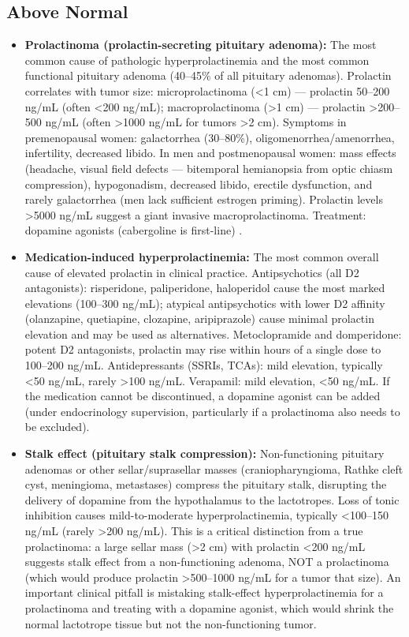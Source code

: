 \subsection*{Above Normal}
\begin{itemize}
  \item \textbf{Prolactinoma (prolactin-secreting pituitary adenoma):} The most common cause of pathologic hyperprolactinemia and the most common functional pituitary adenoma (40--45\% of all pituitary adenomas). Prolactin correlates with tumor size: microprolactinoma (<1 cm) --- prolactin 50--200 ng/mL (often <200 ng/mL); macroprolactinoma (>1 cm) --- prolactin >200--500 ng/mL (often >1000 ng/mL for tumors >2 cm). Symptoms in premenopausal women: galactorrhea (30--80\%), oligomenorrhea/amenorrhea, infertility, decreased libido. In men and postmenopausal women: mass effects (headache, visual field defects --- bitemporal hemianopsia from optic chiasm compression), hypogonadism, decreased libido, erectile dysfunction, and rarely galactorrhea (men lack sufficient estrogen priming). Prolactin levels >5000 ng/mL suggest a giant invasive macroprolactinoma. Treatment: dopamine agonists (cabergoline is first-line) \cite{wong2015update2}.
  \item \textbf{Medication-induced hyperprolactinemia:} The most common overall cause of elevated prolactin in clinical practice. Antipsychotics (all D2 antagonists): risperidone, paliperidone, haloperidol cause the most marked elevations (100--300 ng/mL); atypical antipsychotics with lower D2 affinity (olanzapine, quetiapine, clozapine, aripiprazole) cause minimal prolactin elevation and may be used as alternatives. Metoclopramide and domperidone: potent D2 antagonists, prolactin may rise within hours of a single dose to 100--200 ng/mL. Antidepressants (SSRIs, TCAs): mild elevation, typically <50 ng/mL, rarely >100 ng/mL. Verapamil: mild elevation, <50 ng/mL. If the medication cannot be discontinued, a dopamine agonist can be added (under endocrinology supervision, particularly if a prolactinoma also needs to be excluded).
  \item \textbf{Stalk effect (pituitary stalk compression):} Non-functioning pituitary adenomas or other sellar/suprasellar masses (craniopharyngioma, Rathke cleft cyst, meningioma, metastases) compress the pituitary stalk, disrupting the delivery of dopamine from the hypothalamus to the lactotropes. Loss of tonic inhibition causes mild-to-moderate hyperprolactinemia, typically <100--150 ng/mL (rarely >200 ng/mL). This is a critical distinction from a true prolactinoma: a large sellar mass (>2 cm) with prolactin <200 ng/mL suggests stalk effect from a non-functioning adenoma, NOT a prolactinoma (which would produce prolactin >500--1000 ng/mL for a tumor that size). An important clinical pitfall is mistaking stalk-effect hyperprolactinemia for a prolactinoma and treating with a dopamine agonist, which would shrink the normal lactotrope tissue but not the non-functioning tumor.

\end{itemize}
